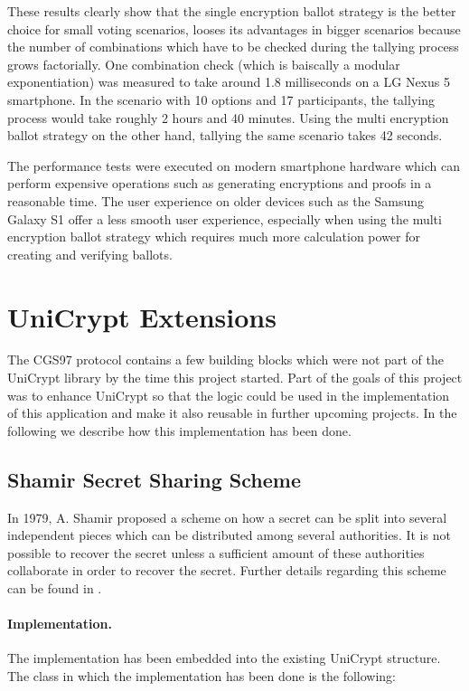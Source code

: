 \documentclass[numbers=noenddot, abstract=on, a4paper, headsepline,
footsepline, oneside, draft=off]{scrreprt}
\begin{document}
These results clearly show that the single encryption ballot strategy is the
better choice for small voting scenarios, looses its advantages in bigger
scenarios because the number of combinations which have to be checked during the
tallying process grows factorially. One combination check (which is
baiscally a modular exponentiation) was measured to take around
1.8 milliseconds on a LG Nexus 5 smartphone. In the scenario with 10 options and
17 participants, the tallying process would take roughly 2 hours and 40 minutes.
Using the multi encryption ballot strategy on the other hand, tallying the same
scenario takes 42 seconds. 

The performance tests were executed on modern smartphone hardware which can
perform expensive operations such as generating encryptions and proofs in a
reasonable time. The user experience on older devices such as the Samsung Galaxy
S1 offer a less smooth user experience, especially when using the multi
encryption ballot strategy which requires much more calculation power for
creating and verifying ballots.

\section{UniCrypt Extensions}
\label{sec:enhancmentsunicrypt}
The CGS97 protocol contains a few building blocks which were not part of the
UniCrypt library by the time this project started. Part of the goals of this
project was to enhance UniCrypt so that the logic could be used in the
implementation of this application and make it also reusable in further upcoming
projects. In the following we describe how this implementation has been done.

\subsection{Shamir Secret Sharing Scheme}
In 1979, A. Shamir proposed a scheme \cite{Shamir79} on how a secret can be
split into several independent pieces which can be distributed among several
authorities. It is not possible to recover the secret unless a sufficient amount
of these authorities collaborate in order to recover the secret. Further details
regarding this scheme can be found in .

\paragraph{Implementation.} The implementation has been embedded into the
existing UniCrypt structure.
The class in which the implementation has been done is the following:
\end{document}
